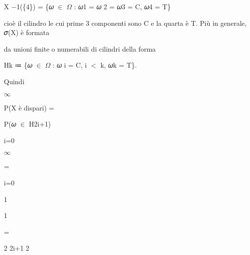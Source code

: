 \documentclass[a4paper,portrait,12pt]{article}
\begin{document}
\begin{flushleft}
X $-$1(\{4\}) = \{𝜔 $\in$ $\Omega$ : 𝜔1 = 𝜔 2 = 𝜔3 = C, 𝜔4 = T\}
\end{flushleft}


\begin{flushleft}
cio\`{e} il cilindro le cui prime 3 componenti sono C e la quarta \`{e} T. Più in generale, 𝜎(X) \`{e} formata
\end{flushleft}


\begin{flushleft}
da unioni finite o numerabili di cilindri della forma
\end{flushleft}


\begin{flushleft}
Hk ≔ \{𝜔 $\in$ $\Omega$ : 𝜔 i = C, i $<$ k, 𝜔k = T\}.
\end{flushleft}


\begin{flushleft}
Quindi
\end{flushleft}


$\infty$





\begin{flushleft}
P(X \`{e} dispari) =
\end{flushleft}





\begin{flushleft}
P(𝜔 $\in$ H2i+1)
\end{flushleft}


\begin{flushleft}
i=0
\end{flushleft}


$\infty$





=


\begin{flushleft}
i=0
\end{flushleft}





1





1


=


\begin{flushleft}
2 2i+1 2
\end{flushleft}
\end{document}
